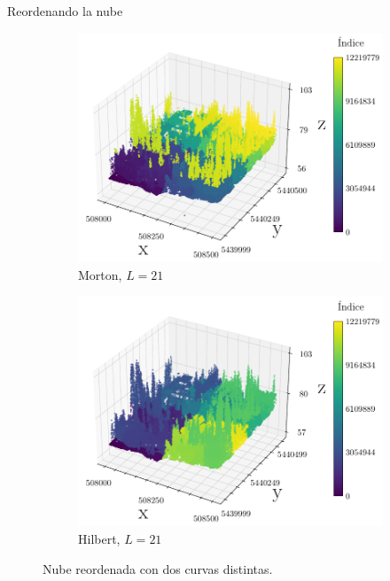 \documentclass[aspectratio=169]{beamer}
\begin{document}
\begin{frame}{Reordenando la nube}
    \begin{figure}
        \centering
        \begin{subfigure}{0.45\textwidth}
            \centering
            \includegraphics[width=\linewidth]{img/plot_5080-54400_morton.pdf}
            \caption{Morton, $L = 21$}
        \end{subfigure}
        \hfill
        \begin{subfigure}{0.45\textwidth}
            \centering
            \includegraphics[width=\linewidth]{img/plot_5080-54400_hilbert.pdf}
            \caption{Hilbert, $L = 21$}
        \end{subfigure}
        \caption{Nube reordenada con dos curvas distintas.}
    \end{figure}
\end{frame}
\end{document}
